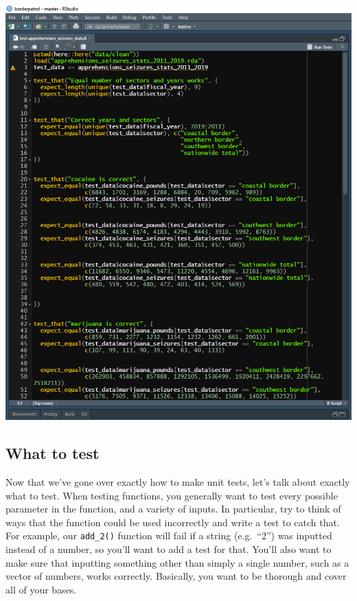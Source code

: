 \documentclass[
]{krantz}
\begin{document}
\includegraphics{images/test_example.PNG}

\hypertarget{what-to-test}{%
\subsection{What to test}\label{what-to-test}}

Now that we've gone over exactly how to make unit tests, let's talk about exactly what to test. When testing functions, you generally want to test every possible parameter in the function, and a variety of inputs. In particular, try to think of ways that the function could be used incorrectly and write a test to catch that. For example, our \texttt{add\_2()} function will fail if a string (e.g.~``2'') was inputted instead of a number, so you'll want to add a test for that. You'll also want to make sure that inputting something other than simply a single number, such as a vector of numbers, works correctly. Basically, you want to be thorough and cover all of your bases.
\end{document}

